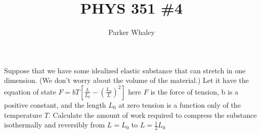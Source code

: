 \documentclass[10pt,a4paper]{article}
\author{Parker Whaley}
\title{PHYS 351 \#4}
\begin{document}
\maketitle

Suppose that we have some idealized elastic substance that can stretch in one dimension. (We don’t worry about the volume of the material.) Let it have the equation of state $F=bT[\frac{L}{L_0}-(\frac{L_0}{L})^2]$ here $F$ is the force of tension, b is a positive constant, and the length $L_0$ at zero tension is a function only of the temperature $T$.  Calculate the amount of work required to compress the substance isothermally and  reversibly from $L = L_0$ to $L = \frac{1}{2}L_0$
\end{document}
